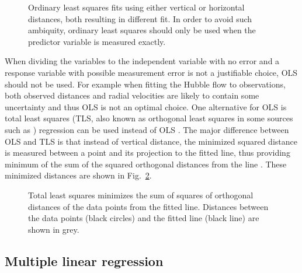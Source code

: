 \documentclass[english, oneside]{HYgradu}
\newcommand{\matr}[1]{\mathbf{#1}}
\begin{document}
\begin{figure}
    \centering
    
    \caption{Ordinary least squares fits using either vertical or horizontal distances, both resulting in different fit. In order to avoid such ambiquity, ordinary least squares should only be used when the predictor variable is measured exactly.}\label{fig:OLSproblem}
\end{figure}

When dividing the variables to the independent variable with no error and a response variable with possible measurement error is not a justifiable choice, OLS should not be used. For example when fitting the Hubble flow to observations, both observed distances and radial velocities are likely to contain some uncertainty and thus OLS is not an optimal choice. One alternative for OLS is total least squares (TLS, also known as orthogonal least squares in some sources such as \citet{feigelson2012modern}) regression can be used instead of OLS \citep{markovsky2007overview}.  The major difference between OLS and TLS is that instead of vertical distance, the minimized squared distance is measured between a point and its projection to the fitted line, thus providing minimum of the sum of the squared orthogonal distances from the line \citep{feigelson2012modern}. These minimized distances are shown in Fig.\ \ref{fig:TLS}.

\begin{figure}
    \centering
    
    \caption{Total least squares minimizes the sum of squares of orthogonal distances of the data points from the fitted line. Distances between the data points (black circles) and the fitted line (black line) are shown in grey.}\label{fig:TLS}
\end{figure}



\subsection{Multiple linear regression}


\end{document}
